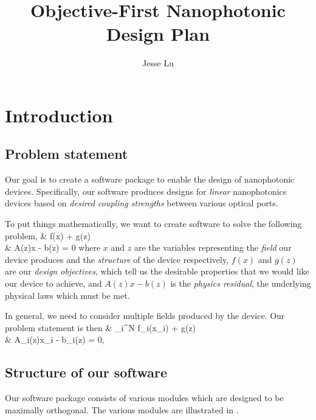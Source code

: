 \documentclass{book}
\title{Objective-First Nanophotonic Design Plan}
\author{Jesse Lu}
\begin{document}
\maketitle
\tableofcontents


\chapter{Introduction}
\section{Problem statement}
Our goal is to create a software package 
    to enable the design of nanophotonic devices.
Specifically, our software produces designs for
    \emph{linear} nanophotonics devices based on
    \emph{desired coupling strengths} between various optical ports.


To put things mathematically, we want to create software 
    to solve the following problem,
        {\minimize&  f(x) + g(z) \\
        \subto&     A(z)x - b(z) = 0}
    where 
    \BI $x$ and $z$ are the variables representing 
            the \emph{field} our device produces and
            the \emph{structure} of the device respectively,
    \I  $f(x)$ and $g(z)$ are our \emph{design objectives},
            which tell us the desirable properties 
            that we would like our device to achieve, and
    \I  $A(z)x - b(z)$ is the \emph{physics residual},
            the underlying physical laws which must be met. \EI

In general, we need to consider multiple fields produced 
    by the device.
Our problem statement is then
        {\minimize&  \sum_i^N f_i(x_i) + g(z) \\
        \subto&     A_i(z)x_i - b_i(z) = 0,\quad{}}

\section{Structure of our software}
Our software package consists of various modules
    which are designed to be maximally orthogonal.
The various modules are illustrated in .
\end{document}
